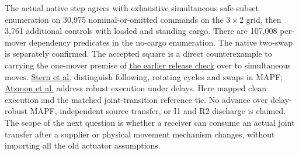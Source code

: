 \documentclass[11pt]{article}
\begin{document}
The actual native step agrees with exhaustive simultaneous safe-subset enumeration on 30,975 nominal-or-omitted commands on the $3\times 2$ grid, then 3,761 additional controls with loaded and standing cargo. There are 107,008 per-mover dependency predicates in the no-cargo enumeration. The native two-swap is separately confirmed. The accepted square is a direct counterexample to carrying the one-mover premise of \href{https://github.com/eternal-november/eos-research-programmes/pull/427}{the earlier release check} over to simultaneous moves. \href{https://arxiv.org/abs/1906.08291}{Stern et al.} distinguish following, rotating cycles and swaps in MAPF; \href{https://ojs.aaai.org/index.php/SOCS/article/view/18415}{Atzmon et al.} address robust execution under delays. Here mapped clean execution and the matched joint-transition reference tie. No advance over delay-robust MAPF, independent source transfer, or I1 and R2 discharge is claimed. The scope of the next question is whether a receiver can consume an actual joint transfer after a supplier or physical movement mechanism changes, without importing all the old actuator assumptions.
\end{document}
